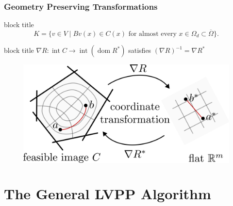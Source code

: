 \documentclass[aspectratio=169,xcolor=dvipsnames,11pt]{beamer}
\begin{document}
\begin{frame}

\end{frame}

\begin{frame}\frametitle{Geometry Preserving Transformations}

\begin{beamercolorbox}[rounded=true, shadow=true, wd=\textwidth]{block title}
\begin{equation*} \label{eq:intro:feasible_set}
K = \{ v \in V \mid Bv(x) \in C(x) \text{ for almost every } x \in \Omega_d \subset \overline{\Omega} \}.
\end{equation*}
\end{beamercolorbox}\hfill

\begin{minipage}{0.5\linewidth}
\begin{beamercolorbox}[rounded=true, shadow=true, wd=\textwidth]{block title}
\centering
 $\nabla R \colon \operatorname{int}C \to \operatorname{int}(\operatorname{dom} R^*)$ satisfies %
 $(\nabla R)^{-1} = \nabla R^\ast$
\end{beamercolorbox}
\end{minipage}
%
\begin{minipage}{0.4\linewidth}
\begin{figure}[h]
\includegraphics[width=0.8\linewidth]{figures/Geodesic3.png} 
\end{figure}
\end{minipage}
\end{frame}

\section{The General LVPP Algorithm}
\end{document}
